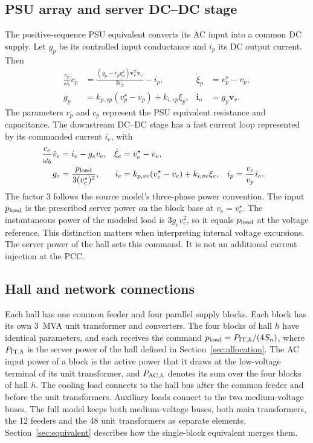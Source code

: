 \subsection{PSU array and server DC--DC stage}
The positive-sequence PSU equivalent converts its AC input into a common DC supply.
Let $g_p$ be its controlled input conductance and $i_p$ its DC output current.
Then
\begin{align}
\frac{c_p}{\omega_b}\dot v_p&=\frac{(g_p-r_p g_p^2)\bm v_v^{\mathsf T}\bm v_v}{3v_p}-i_p, &
\dot\xi_p&=v_p^\star-v_p,\\
g_p&=k_{p,vp}(v_p^\star-v_p)+k_{i,vp}\xi_p, & \bm i_o&=g_p\bm v_v.
\end{align}
The parameters $r_p$ and $c_p$ represent the PSU equivalent resistance and capacitance.
The downstream DC--DC stage has a fast current loop represented by its commanded current $i_e$, with
\begin{align}
\frac{c_e}{\omega_b}\dot v_e&=i_e-g_e v_e, & \dot\xi_e&=v_e^\star-v_e,\\
g_e&=\frac{p_{\rm load}}{3(v_e^\star)^2}, &
i_e&=k_{p,ve}(v_e^\star-v_e)+k_{i,ve}\xi_e, &
i_p&=\frac{v_e}{v_p}i_e.
\end{align}
The factor 3 follows the source model's three-phase power convention.
The input $p_{\rm load}$ is the prescribed server power on the block base at $v_e=v_e^\star$.
The instantaneous power of the modeled load is $3g_e v_e^2$, so it equals $p_{\rm load}$ at the voltage reference.
This distinction matters when interpreting internal voltage excursions.
The server power of the hall sets this command.
It is not an additional current injection at the PCC.

\subsection{Hall and network connections}
Each hall has one common feeder and four parallel supply blocks.
Each block has its own 3~MVA unit transformer and converters.
The four blocks of hall $h$ have identical parameters, and each receives the command $p_{\rm load}=P_{{\rm IT},h}/(4S_n)$, where $P_{{\rm IT},h}$ is the server power of the hall defined in Section~\ref{sec:allocation}.
The AC input power of a block is the active power that it draws at the low-voltage terminal of its unit transformer, and $P_{{\rm AC},h}$ denotes its sum over the four blocks of hall $h$.
The cooling load connects to the hall bus after the common feeder and before the unit transformers.
Auxiliary loads connect to the two medium-voltage buses.
The full model keeps both medium-voltage buses, both main transformers, the 12 feeders and the 48 unit transformers as separate elements.
Section~\ref{sec:equivalent} describes how the single-block equivalent merges them.

